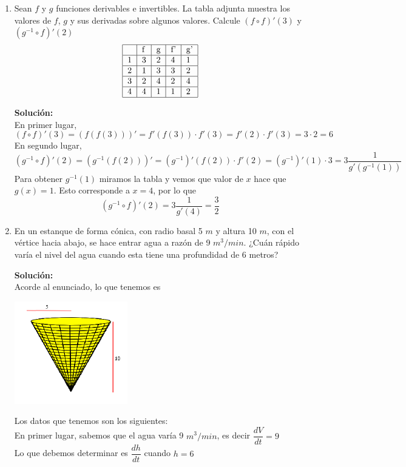 \documentclass[12pt]{article}
\newenvironment{solucion}
{\begin{mdframed}[backgroundcolor=black!10]
		{\bf Solución:}\\
	}
	{
	\end{mdframed}
}
\newenvironment{preguntas}
{\begin{enumerate}\itemsep12pt
	}
	{
	\end{enumerate}
}
\begin{document}
\begin{preguntas}
\begin{solucion}
\end{solucion}
\item Sean $f$ y $g$ funciones derivables e invertibles. La tabla adjunta muestra los valores de $f$, $g$ y sus derivadas sobre algunos valores. Calcule $(f \circ f)'(3)$ y $(g^{-1} \circ f)'(2)$
$$
\begin{tabular}{|l|l|l|l|l|}
\hline
  & f & g & f' & g' \\ \hline
1 & 3 & 2 & 4  & 1  \\ \hline
2 & 1 & 3 & 3  & 2  \\ \hline
3 & 2 & 4 & 2  & 4  \\ \hline
4 & 4 & 1 & 1  & 2  \\ \hline
\end{tabular}
$$
\begin{solucion}
En primer lugar,
$$(f \circ f)'(3) = (f(f(3)))' = f'(f(3))\cdot f'(3) = f'(2) \cdot f'(3) = 3 \cdot 2 = 6$$
En segundo lugar,	
$$(g^{-1} \circ f)'(2) = (g^{-1}(f(2)))' = (g^{-1})'(f(2)) \cdot f'(2) = (g^{-1})'(1)\cdot 3 = 3\dfrac{1}{g'(g^{-1}(1))}$$
Para obtener $g^{-1}(1)$ miramos la tabla y vemos que valor de $x$ hace que $g(x) = 1$. Esto corresponde a $x=4$, por lo que
$$(g^{-1} \circ f)'(2) = 3\dfrac{1}{g'(4)} = \dfrac{3}{2}$$
\end{solucion}
\item En un estanque de forma cónica, con radio basal 5 $m$ y altura 10 $m$, con el vértice hacia abajo, se hace entrar agua a razón de 9 $m^3/min$. ¿Cuán rápido varía el nivel del agua cuando esta tiene una profundidad de 6 metros?
\begin{solucion}
Acorde al enunciado, lo que tenemos es
\begin{center}
\includegraphics[]{cono.PNG}
\end{center}
Los datos que tenemos son los siguientes:\\
En primer lugar, sabemos que el agua varía 9 $m^3/min$, es decir $\dfrac{dV}{dt} = 9$\\
Lo que debemos determinar es $\dfrac{dh}{dt}$ cuando $h=6$\\

\end{solucion}
\end{preguntas}
\end{document}
